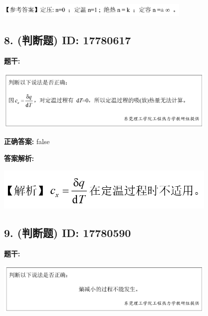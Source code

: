 \documentclass[12pt]{article}
\begin{document}
\begin{center}\includegraphics[width=0.7\textwidth, height=0.2\textheight, keepaspectratio]{question_7_17780628/correct_answer_1_img_1.png}\end{center}

\vspace{0.5em}\hrulefill\vspace{1em}

\subsection*{8. (判断题) \small ID: 17780617}

\textbf{题干:}


\begin{center}\includegraphics[width=0.8\textwidth, height=0.25\textheight, keepaspectratio]{question_8_17780617/title_img_1.png}\end{center}

\textbf{正确答案:}
false

\textbf{答案解析:}


\begin{center}\includegraphics[width=0.8\textwidth, height=0.25\textheight, keepaspectratio]{question_8_17780617/correct_replay_img_1.png}\end{center}

\vspace{0.5em}\hrulefill\vspace{1em}

\subsection*{9. (判断题) \small ID: 17780590}

\textbf{题干:}


\begin{center}\includegraphics[width=0.8\textwidth, height=0.25\textheight, keepaspectratio]{question_9_17780590/title_img_1.png}\end{center}
\end{document}
